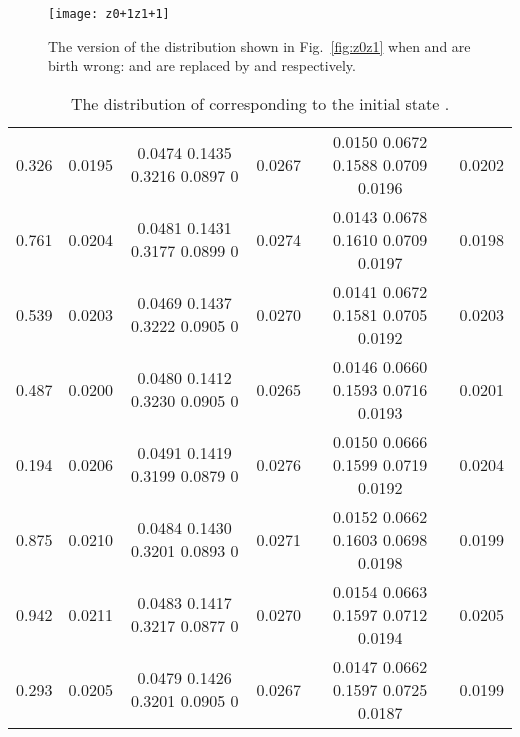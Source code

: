 \documentclass[twocolumn]{svjour3}
\newlength\imagewidth
\begin{document}
\begin{figure}[!htb]
\centering
\begin{minipage}[t]{\imagewidth}
\centering
\texttt{[image: z0+1z1+1]}
\end{minipage}
\caption{The version of the distribution shown in Fig.~\ref{fig:z0z1} when 
and  are birth wrong:  and  are replaced by  and  respectively.}
\label{fig:z0+1z1+1}
\end{figure}

\begin{table*}[!htp]
\center\caption{The distribution of  corresponding to the initial state .}
\begin{tabular}{c|c|c|c|c|c}
  \hline    &      &         &  &    & \\
  \hline  0.326  & 0.0195 & 0.0474    0.1435    0.3216    0.0897   0 & 0.0267 &   0.0150    0.0672    0.1588    0.0709    0.0196        & 0.0202       \\
  \hline  0.761  & 0.0204 & 0.0481    0.1431    0.3177    0.0899   0 & 0.0274 &   0.0143    0.0678    0.1610    0.0709    0.0197        & 0.0198       \\
  \hline  0.539  & 0.0203 & 0.0469    0.1437    0.3222    0.0905   0 & 0.0270 &   0.0141    0.0672    0.1581    0.0705    0.0192        & 0.0203       \\
  \hline  0.487  & 0.0200 & 0.0480    0.1412    0.3230    0.0905   0 & 0.0265 &   0.0146    0.0660    0.1593    0.0716    0.0193        & 0.0201       \\
  \hline  0.194  & 0.0206 & 0.0491    0.1419    0.3199    0.0879   0 & 0.0276 &   0.0150    0.0666    0.1599    0.0719    0.0192        & 0.0204       \\
  \hline  0.875  & 0.0210 & 0.0484    0.1430    0.3201    0.0893   0 & 0.0271 &   0.0152    0.0662    0.1603    0.0698    0.0198        & 0.0199       \\
  \hline  0.942  & 0.0211 & 0.0483    0.1417    0.3217    0.0877   0 & 0.0270 &   0.0154    0.0663    0.1597    0.0712    0.0194        & 0.0205       \\
  \hline  0.293  & 0.0205 & 0.0479    0.1426    0.3201    0.0905   0 & 0.0267 &   0.0147    0.0662    0.1597    0.0725    0.0187        & 0.0199       \\
  \hline
\end{tabular}
\label{table:distributionerror}
\end{table*}
\end{document}
